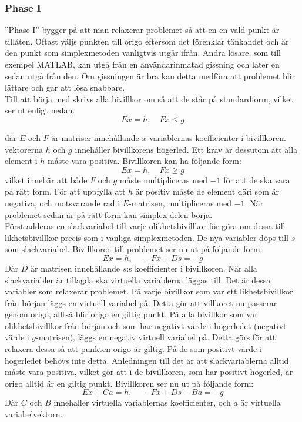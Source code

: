 \subsubsection{Phase I}
''Phase I'' bygger på att man relaxerar problemet så att en en vald punkt är tillåten. Oftast väljs punkten till origo eftersom det förenklar tänkandet och är den punkt som simplexmetoden vanligtvis utgår ifrån. Andra lösare, som till exempel MATLAB, kan utgå från en användarinmatad gissning och låter en sedan utgå från den\citep{quadprog}. Om gissningen är bra kan detta medföra att problemet blir lättare och går att lösa snabbare. \\
Till att börja med skrivs alla bivillkor om så att de står på standardform, vilket ser ut enligt nedan.
$$Ex = h, \quad Fx \leq g$$
\raggedright där $E$ och $F$ är matriser innehållande $x$-variablernas koefficienter i bivillkoren. vektorerna $h$ och $g$ innehåller bivillkorens högerled. Ett krav är dessutom att alla element i $h$ måste vara positiva.
Bivillkoren kan ha följande form:
$$Ex = h, \quad Fx \geq g$$
vilket innebär att både $F$ och $g$ måste multipliceras med $-1$ för att de ska vara på rätt form. För att uppfylla att $h$ är positiv måste de element däri som är negativa, och motsvarande rad i $E$-matrisen, multipliceras med $-1$.
När problemet sedan är på rätt form kan simplex-delen börja. \\
Först adderas en slackvariabel till varje olikhetsbivillkor för göra om dessa till likhetsbivillkor precis som i vanliga simplexmetoden. De nya variabler döps till $s$ som slackvariabel. Bivillkoren till problemet ser nu ut på följande form:
$$Ex = h, \quad -Fx+Ds = -g$$
Där $D$ är matrisen innehållande $s$:s koefficienter i bivillkoren.
När alla slackvariabler är tillagda ska virtuella variablerna läggas till. Det är dessa variabler som relaxerar problemet. På varje bivillkor som var ett likhetsbivillkor från början läggs en virtuell variabel på. Detta gör att villkoret nu passerar genom origo, alltså blir origo en giltig punkt. På alla bivillkor som var olikhetsbivillkor från början och som har negativt värde i högerledet (negativt värde i $g$-matrisen), läggs en negativ virtuell variabel på. Detta görs för att relaxera dessa så att punkten origo är giltig. På de som positivt värde i högerledet behövs inte detta. Anledningen till det är att slackvariablerna alltid måste vara positiva, vilket gör att i de bivillkoren, som har positivt högerled, är origo alltid är en giltig punkt. Bivillkoren ser nu ut på följande form:
$$Ex+Ca = h, \quad -Fx + Ds - Ba = -g$$
Där $C$ och $B$ innehåller virtuella variablernas koefficienter, och $a$ är virtuella variabelvektorn. \\ 
